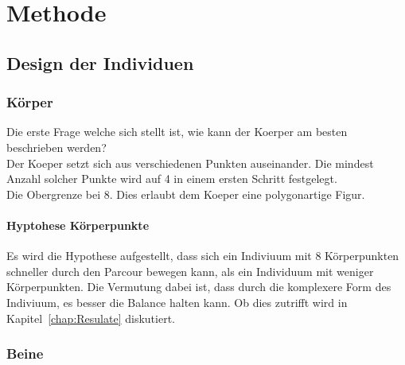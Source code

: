 %
%


\chapter{Methode}


  \section{Design der Individuen}

    \subsection{Körper\label{sub:Körper}}

      Die erste Frage welche sich stellt ist, wie kann der Koerper am besten beschrieben werden? \\
      Der Koeper setzt sich aus verschiedenen Punkten auseinander.
      Die mindest Anzahl solcher Punkte wird auf 4 in einem ersten Schritt festgelegt. \\
      Die Obergrenze bei 8. Dies erlaubt dem Koeper eine polygonartige Figur.

      \subsubsection{Hyptohese Körperpunkte\label{subsub:hypoKp}}

        Es wird die Hypothese aufgestellt,
        dass sich ein Indiviuum mit 8 Körperpunkten schneller durch den Parcour bewegen kann,
        als ein Individuum mit weniger Körperpunkten.
        Die Vermutung dabei ist, dass durch die komplexere Form des Indiviuum, es besser die Balance halten kann.
        Ob dies zutrifft wird in Kapitel~\ref{chap:Resulate} diskutiert.

    \subsection{Beine\label{sub:Beine}}


